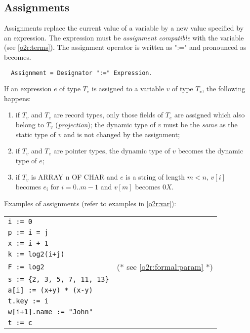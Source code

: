 \subsection{Assignments}

Assignments replace the current value of a variable by a new value
specified by an expression. The expression must be {\em assignment
compatible} with the variable (see \ref{o2r:terms}).
The assignment operator is written as ":=" and pronounced as becomes.
{\BNFsize
\begin{verbatim}
  Assignment = Designator ":=" Expression.
\end{verbatim}}

If an expression $e$ of type $T_e$ is assigned to a variable $v$ of type
$T_v$, the following happens:
\begin{enumerate}
\item
if $T_v$ and $T_e$ are record types, only those fields
of $T_e$ are assigned which also belong to $T_v$ ({\em projection}); the
dynamic type of $v$ must be the {\em same} as the static type of $v$ and is
not changed by the assignment;
\item
if $T_v$ and $T_e$ are pointer types, the dynamic type
of $v$ becomes the dynamic type of $e$;
\item
if $T_v$ is ARRAY n OF CHAR and $e$ is a string of length
$m < n$, $v[i]$ becomes $e_i$ for $i=0..m-1$ and $v[m]$ becomes $0X$.
\end{enumerate}

\noindent
Examples of assignments (refer to examples in \ref{o2r:var}):
\begin{flushleft}
\begin{tabular}{ll}
\tt i :=  0                             \\
\tt p := i = j                          \\
\tt x := i + 1                          \\
\tt k := log2(i+j)                      \\
\tt F := log2                  & (* see \ref{o2r:formal:param} *) \\
\verb|s := {2, 3, 5, 7, 11, 13}|           \\
\tt a[i] := (x+y) * (x-y)               \\
\tt t.key := i                          \\
\tt w[i+1].name := "John"               \\
\tt t := c                              \\
\end{tabular}
\end{flushleft}

